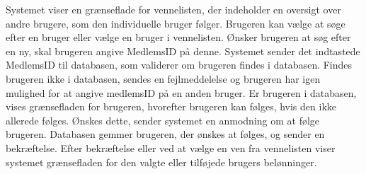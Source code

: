 \noindent
Systemet viser en grænseflade for vennelisten, der indeholder en oversigt over andre brugere, som den individuelle bruger følger. Brugeren kan vælge at søge efter en bruger eller vælge en bruger i vennelisten. Ønsker brugeren at søg efter en ny, skal brugeren angive MedlemsID på denne. Systemet sender det indtastede MedlemsID til databasen, som validerer om brugeren findes i databasen. Findes brugeren ikke i databasen, sendes en fejlmeddelelse og brugeren har igen mulighed for at angive medlemsID på en anden bruger. Er brugeren i databasen, vises grænsefladen for brugeren, hvorefter brugeren kan følges, hvis den ikke allerede følges. Ønskes dette, sender systemet en anmodning om at følge brugeren. Databasen gemmer brugeren, der ønskes at følges, og sender en bekræftelse. Efter bekræftelse eller ved at vælge en ven fra vennelisten viser systemet grænsefladen for den valgte eller tilføjede brugers belønninger.

 





